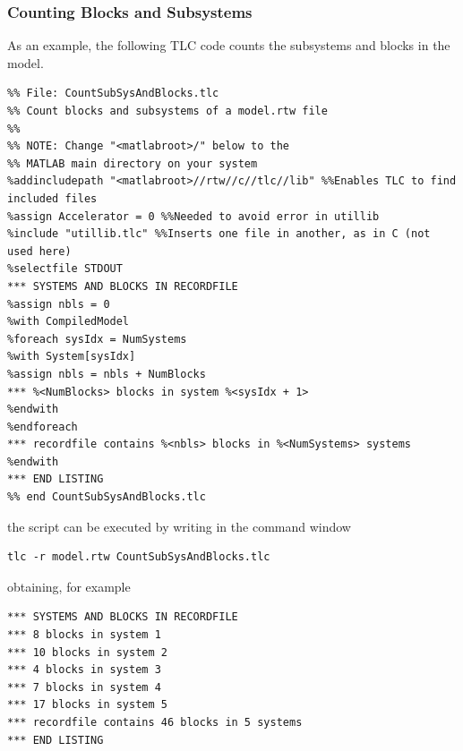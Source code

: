 \subsubsection{Counting Blocks and Subsystems}
As an example, the following TLC code counts the subsystems and blocks in the model.
\begin{lstlisting}
%% File: CountSubSysAndBlocks.tlc
%% Count blocks and subsystems of a model.rtw file
%%
%% NOTE: Change "<matlabroot>/" below to the
%% MATLAB main directory on your system
%addincludepath "<matlabroot>//rtw//c//tlc//lib" %%Enables TLC to find included files
%assign Accelerator = 0 %%Needed to avoid error in utillib
%include "utillib.tlc" %%Inserts one file in another, as in C (not used here)
%selectfile STDOUT
*** SYSTEMS AND BLOCKS IN RECORDFILE
%assign nbls = 0
%with CompiledModel
%foreach sysIdx = NumSystems
%with System[sysIdx]
%assign nbls = nbls + NumBlocks
*** %<NumBlocks> blocks in system %<sysIdx + 1>
%endwith
%endforeach
*** recordfile contains %<nbls> blocks in %<NumSystems> systems
%endwith
*** END LISTING
%% end CountSubSysAndBlocks.tlc
\end{lstlisting}
the script can be executed by writing in the command window
\begin{verbatim}
tlc -r model.rtw CountSubSysAndBlocks.tlc
\end{verbatim}
obtaining, for example
\begin{verbatim}
*** SYSTEMS AND BLOCKS IN RECORDFILE
*** 8 blocks in system 1
*** 10 blocks in system 2
*** 4 blocks in system 3
*** 7 blocks in system 4
*** 17 blocks in system 5
*** recordfile contains 46 blocks in 5 systems
*** END LISTING
\end{verbatim}


